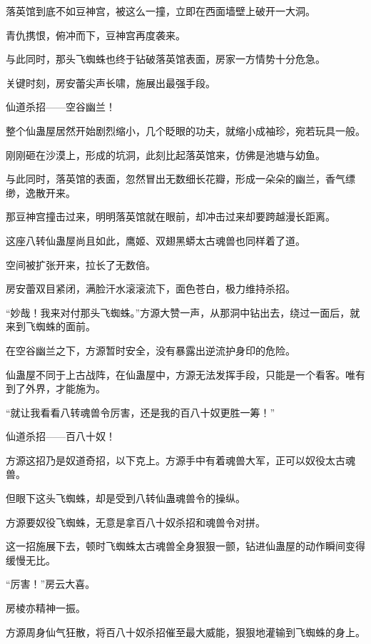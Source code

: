 
\begin{this_body}

落英馆到底不如豆神宫，被这么一撞，立即在西面墙壁上破开一大洞。

青仇携恨，俯冲而下，豆神宫再度袭来。

与此同时，那头飞蜘蛛也终于钻破落英馆表面，房家一方情势十分危急。

关键时刻，房安蕾尖声长啸，施展出最强手段。

仙道杀招——空谷幽兰！

整个仙蛊屋居然开始剧烈缩小，几个眨眼的功夫，就缩小成袖珍，宛若玩具一般。

刚刚砸在沙漠上，形成的坑洞，此刻比起落英馆来，仿佛是池塘与幼鱼。

与此同时，落英馆的表面，忽然冒出无数细长花瓣，形成一朵朵的幽兰，香气缥缈，逸散开来。

那豆神宫撞击过来，明明落英馆就在眼前，却冲击过来却要跨越漫长距离。

这座八转仙蛊屋尚且如此，鹰姬、双翅黑蟒太古魂兽也同样着了道。

空间被扩张开来，拉长了无数倍。

房安蕾双目紧闭，满脸汗水滚滚流下，面色苍白，极力维持杀招。

“妙哉！我来对付那头飞蜘蛛。”方源大赞一声，从那洞中钻出去，绕过一面后，就来到飞蜘蛛的面前。

在空谷幽兰之下，方源暂时安全，没有暴露出逆流护身印的危险。

仙蛊屋不同于上古战阵，在仙蛊屋中，方源无法发挥手段，只能是一个看客。唯有到了外界，才能施为。

“就让我看看八转魂兽令厉害，还是我的百八十奴更胜一筹！”

仙道杀招——百八十奴！

方源这招乃是奴道奇招，以下克上。方源手中有着魂兽大军，正可以奴役太古魂兽。

但眼下这头飞蜘蛛，却是受到八转仙蛊魂兽令的操纵。

方源要奴役飞蜘蛛，无意是拿百八十奴杀招和魂兽令对拼。

这一招施展下去，顿时飞蜘蛛太古魂兽全身狠狠一颤，钻进仙蛊屋的动作瞬间变得缓慢无比。

“厉害！”房云大喜。

房棱亦精神一振。

方源周身仙气狂散，将百八十奴杀招催至最大威能，狠狠地灌输到飞蜘蛛的身上。


\end{this_body}
